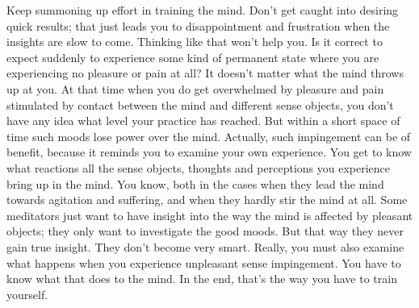 Keep summoning up effort in training the mind. Don't get caught into desiring quick results; that just leads you to disappointment and frustration when the insights are slow to come. Thinking like that won't help you. Is it correct to expect suddenly to experience some kind of permanent state where you are experiencing no pleasure or pain at all? It doesn't matter what the mind throws up at you. At that time when you do get overwhelmed by pleasure and pain stimulated by contact between the mind and different sense objects, you don't have any idea what level your practice has reached. But within a short space of time such moods lose power over the mind. Actually, such impingement can be of benefit, because it reminds you to examine your own experience. You get to know what reactions all the sense objects, thoughts and perceptions you experience bring up in the mind. You know, both in the cases when they lead the mind towards agitation and suffering, and when they hardly stir the mind at all. Some meditators just want to have insight into the way the mind is affected by pleasant objects; they only want to investigate the good moods. But that way they never gain true insight. They don't become very smart. Really, you must also examine what happens when you experience unpleasant sense impingement. You have to know what that does to the mind. In the end, that's the way you have to train yourself.

